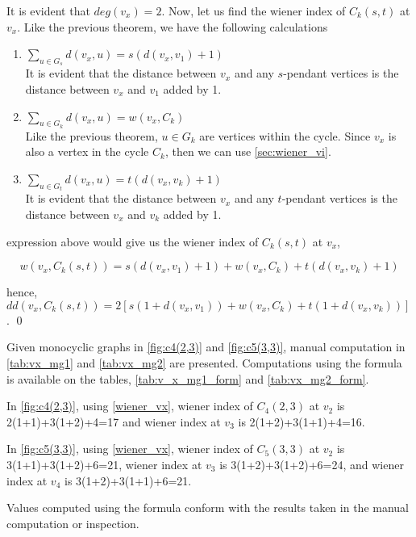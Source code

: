 \proof
It is evident that $deg(v_x)=2$. Now, let us find the wiener index of $C_k(s,t)$ at $v_x$. Like the previous theorem, we have the following calculations

\begin{enumerate}
\item $\sum_{u\in G_s}d(v_x,u)=s(d(v_x,v_1)+1)$ \\
It is evident that the distance between $v_x$ and any $s$-pendant vertices is the distance between $v_x$ and $v_1$ added by 1. 
\item $\sum_{u\in G_k}d(v_x,u)=w(v_x,C_k)$ \\
Like the previous theorem, $u\in G_k$ are vertices within the cycle. Since $v_x$ is also a vertex in the cycle $C_k$, then we can use \href{chap2.tex}{\ref{sec:wiener_vi}}.
\item $\sum_{u\in G_t}d(v_x,u)=t(d(v_x,v_k)+1)$ \\
It is evident that the distance between $v_x$ and any $t$-pendant vertices is the distance between $v_x$ and $v_k$ added by 1. 
\end{enumerate}

expression above would give us the wiener index of $C_k(s,t)$ at $v_x$, 

\begin{equation}
w(v_x,C_k(s,t))=s(d(v_x,v_1)+1)+w(v_x,C_k)+t(d(v_x,v_k)+1)
\label{wiener_vx}
\end{equation} 

hence, $dd(v_x,C_k(s,t))=2\left[s(1+d(v_x,v_1))+w(v_x,C_k)+t(1+d(v_x,v_k))\right]$. \qed

\begin{e.g.}\rm
Given monocyclic graphs in \ref{fig:c4(2,3)} and \ref{fig:c5(3,3)}, manual computation in \ref{tab:vx_mg1} and \ref{tab:vx_mg2} are presented. Computations using the formula is available on the tables, \ref{tab:v_x_mg1_form} and \ref{tab:vx_mg2_form}. 

In \ref{fig:c4(2,3)}, using \ref{wiener_vx}, wiener index of $C_4(2,3)$ at $v_2$ is 2(1+1)+3(1+2)+4=17 and wiener index at $v_3$ is 2(1+2)+3(1+1)+4=16.  

In \ref{fig:c5(3,3)}, using \ref{wiener_vx}, wiener index of $C_5(3,3)$ at $v_2$ is 3(1+1)+3(1+2)+6=21, wiener index at $v_3$ is 3(1+2)+3(1+2)+6=24, and wiener index at $v_4$ is 3(1+2)+3(1+1)+6=21.

Values computed using the formula conform with the results taken in the manual computation or inspection.
\end{e.g.}

